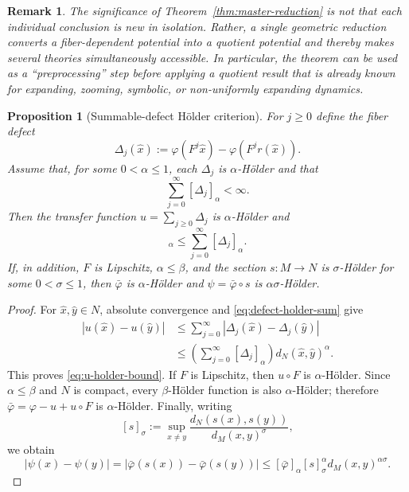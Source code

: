 \documentclass[11pt,a4paper]{article}
\newtheorem{proposition}[theorem]{Proposition}
\newtheorem{remark}[theorem]{Remark}
\begin{document}
\begin{remark}
The significance of Theorem~\ref{thm:master-reduction} is not that each
individual conclusion is new in isolation. Rather, a single geometric
reduction converts a fiber-dependent potential into a quotient potential
and thereby makes several theories simultaneously accessible. In
particular, the theorem can be used as a ``preprocessing'' step before
applying a quotient result that is already known for expanding, zooming,
symbolic, or non-uniformly expanding dynamics.
\end{remark}

\begin{proposition}[Summable-defect H\"older criterion]
\label{prop:holder-reduction}
For $j\ge0$ define the fiber defect
\begin{equation}
\Delta_j(\hat x)
:=\varphi(F^j\hat x)-\varphi(F^jr(\hat x)).
\label{eq:defect-delta}
\end{equation}
Assume that, for some $0<\alpha\le1$, each $\Delta_j$ is
$\alpha$-H\"older and that
\begin{equation}
\sum_{j=0}^{\infty}[\Delta_j]_\alpha<\infty.
\label{eq:defect-holder-sum}
\end{equation}
Then the transfer function $u=\sum_{j\ge0}\Delta_j$ is
$\alpha$-H\"older and
\begin{equation}
[u]_\alpha\le\sum_{j=0}^{\infty}[\Delta_j]_\alpha.
\label{eq:u-holder-bound}
\end{equation}
If, in addition, $F$ is Lipschitz, $\alpha\le\beta$, and the section
$s:M\to N$ is $\sigma$-H\"older for some $0<\sigma\le1$, then $\bar\varphi$ is
$\alpha$-H\"older and $\psi=\bar\varphi\circ s$ is
$\alpha\sigma$-H\"older.
\end{proposition}

\begin{proof}
For $\hat x,\hat y\in N$, absolute convergence and
\eqref{eq:defect-holder-sum} give
\begin{align*}
|u(\hat x)-u(\hat y)|
&\le\sum_{j=0}^{\infty}
|\Delta_j(\hat x)-\Delta_j(\hat y)|\\
&\le\left(\sum_{j=0}^{\infty}[\Delta_j]_\alpha\right)
 d_N(\hat x,\hat y)^\alpha.
\end{align*}
This proves \eqref{eq:u-holder-bound}. If $F$ is Lipschitz, then
$u\circ F$ is $\alpha$-H\"older. Since $\alpha\le\beta$ and $N$ is
compact, every $\beta$-H\"older function is also $\alpha$-H\"older;
therefore
$\bar\varphi=\varphi-u+u\circ F$ is $\alpha$-H\"older. Finally, writing
\[
[s]_\sigma
:=\sup_{x\neq y}\frac{d_N(s(x),s(y))}{d_M(x,y)^\sigma},
\]
we obtain
\[
|\psi(x)-\psi(y)|
=|\bar\varphi(s(x))-\bar\varphi(s(y))|
\le [\bar\varphi]_\alpha [s]_\sigma^\alpha
 d_M(x,y)^{\alpha\sigma}.
\]
\end{proof}
\end{document}
